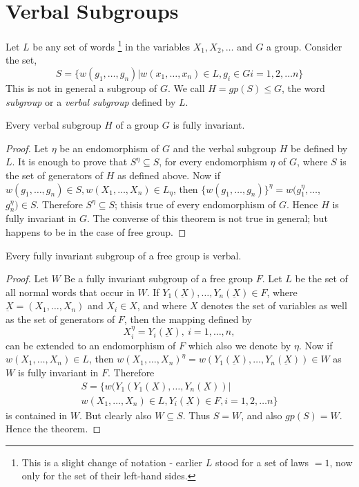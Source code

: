 \setcounter{section}{6}
\section{Verbal Subgroups}\label{chap5:sec7}%
 
Let $L$ be any set of words \footnote{This is a slight change of
  notation - earlier $L$ stood for a set of laws $=1$, now only for
  the set of their left-hand sides.} in the variables $X_1, X_2,\ldots
$ and $G$ a group. Consider the set, 
 $$
 S= \Bigg \{w(g_1,\ldots,g_n) \bigg | w(x_1,\ldots,x_n)\in  L, 
 g_i \in  G i=1,2,\ldots n \Bigg\} 
 $$
 This is not in general a subgroup of $G$. We call $H=gp(S) \leq G$,
 the word \textit{subgroup} or a \textit{verbal subgroup} defined by
 $L$. 
 
\begin{theorem}\label{chap5:sec7:thm3}%
  Every verbal subgroup $H$ of a group $G$ is fully invariant.
\end{theorem}
 
\begin{proof}
  Let $\eta$ be an endomorphism of $G$ and the verbal subgroup $H$ be
  defined by $L$. It is enough to prove that $S^\eta \subseteq S$, for
  every endomorphism $\eta $ of $G$, where $S$ is the set of
  generators of $H$ as defined above. Now if $w(g_1,\ldots 
 ,  g_n) \in  S, w(X_1,\ldots,X_n)\in  L_\eta
  $, then $\bigg\{w(g_1,\ldots,g_n)\bigg \}^\eta = w(g^\eta
  _1,\ldots$, $g^\eta_n) \in  S$. Therefore $S^\eta \subseteq S$;
  this\pageoriginale is true of every endomorphism of $G$. Hence $H$ is fully
  invariant in $G$. The converse of this theorem is not true in
  general; but happens to be in the case of free group. 
\end{proof}  
 
\begin{theorem}\label{chap5:sec7:thm4}%
  Every fully invariant subgroup of a free group is verbal.
\end{theorem} 
 
\begin{proof}
  Let $W$ Be a fully invariant subgroup of a free group $F$. Let $L$
  be the set of all normal words that occur in $W$. If
  $Y_1(\underbar{X}),  \ldots,Y_n (\underbar{X}) \in  F$, where
  $\underbar{X}=(X_1,\ldots,X_n)$ and $X_i \in  X$, and where
  $X$ denotes the set of variables as well as the set of generators of
  $F$, then the mapping defined by 
  $$
  X^\eta_i = Y_i (\underbar{X}), ~ i = 1,\ldots,n,
  $$
  can be extended to an endomorphism of $F$ which also we denote by
  $\eta$. 
  Now if $w(X_1,\ldots,X_n) \in  L$, then
  $w(X_1,\ldots,X_n)^\eta =
  w(Y_1(\underbar{X}),\ldots,Y_n(\underbar{X}))\in  W$ as $W$
  is fully invariant in $F$. Therefore  
  \begin{multline*}
  S= \Bigg \{w(Y_1(Y_1(\underbar{X}),\ldots,Y_n (\underbar{X})) \bigg |\\
  w(X_1,\ldots,X_n)\in  L,   
  Y_i (\underbar{X}) \in  F,  i=1,2,\ldots n \Bigg\}
  \end{multline*}
  is contained in $W$. But clearly also $W \subseteq S$. Thus $S=W$, and
  also $gp(S)=W$. Hence the theorem. 
\end{proof}

